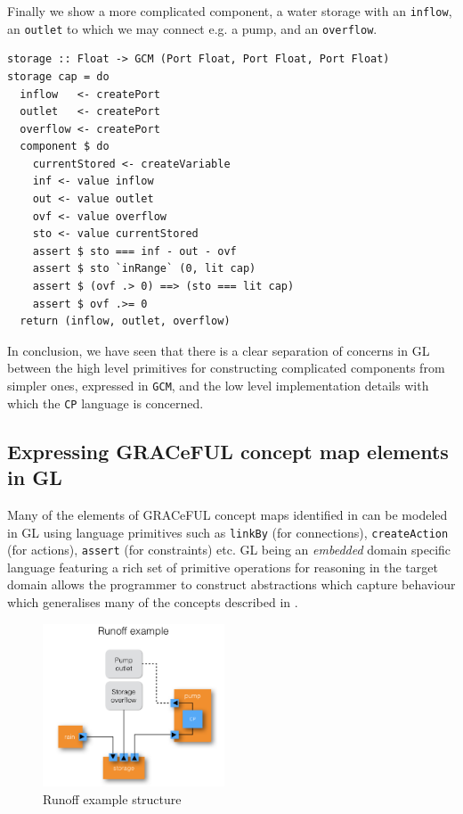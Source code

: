 Finally we show a more complicated component, a water storage with
an \texttt{inflow}, an \texttt{outlet} to which we may connect e.g. a pump,
and an \texttt{overflow}.
\begin{verbatim}
storage :: Float -> GCM (Port Float, Port Float, Port Float)
storage cap = do
  inflow   <- createPort
  outlet   <- createPort
  overflow <- createPort
  component $ do
    currentStored <- createVariable
    inf <- value inflow
    out <- value outlet
    ovf <- value overflow
    sto <- value currentStored
    assert $ sto === inf - out - ovf
    assert $ sto `inRange` (0, lit cap)
    assert $ (ovf .> 0) ==> (sto === lit cap)
    assert $ ovf .>= 0
  return (inflow, outlet, overflow)
\end{verbatim}

In conclusion, we have seen that there is a clear separation of concerns in GL between
the high level primitives for constructing complicated components from
simpler ones, expressed in \texttt{GCM}, and the low level
implementation details with which the \texttt{CP} language is
concerned.

\subsection{Expressing GRACeFUL concept map elements in GL}
Many of the elements of GRACeFUL concept maps identified in
\cite{D4.1} can be modeled in GL using language primitives such as
\texttt{linkBy} (for connections), \texttt{createAction} (for
actions), \texttt{assert} (for constraints) etc.
GL being an \textit{embedded} domain specific language featuring a
rich set of primitive operations for reasoning in the target domain
allows the programmer to construct abstractions which capture
behaviour which generalises many of the concepts described in
\cite{D4.1}.
%
\begin{figure}
  \centering
\includegraphics[width=0.48\textwidth]{fig/RunoffExample.jpg}
  \caption{Runoff example structure}
  \label{fig:RunoffEx}
\end{figure}
%
